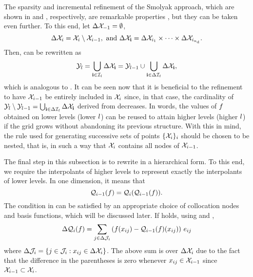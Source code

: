 The sparsity and incremental refinement of the Smolyak approach, which are shown
in  and , respectively, are
remarkable properties \perse, but they can be taken even further. To this end,
let $\Delta\mathcal{X}_{-1} = \emptyset$,
\[
  \Delta\mathcal{X}_i = \mathcal{X}_i \setminus \mathcal{X}_{i - 1}, \text{ and } \Delta\mathcal{X}_{\mathbf{i}} = \Delta\mathcal{X}_{i_1} \times \cdots \times \Delta\mathcal{X}_{i_{n_\text{d}}}.
\]
Then,  can be rewritten as
\begin{equation} \elab{smolyak-grid-incremental}
  \Y_\l = \bigcup_{\vi \in \lindex_\l} \Delta\X_\vi = \Y_{\l - 1} \cup \bigcup_{\vi \in \Delta\lindex_\l} \Delta\X_\vi,
\end{equation}
which is analogous to . It can be seen now that it is
beneficial to the refinement to have $\mathcal{X}_{i - 1}$ be entirely included in $\mathcal{X}_i$
since, in that case, the cardinality of $\mathcal{Y}_l \setminus \mathcal{Y}_{l - 1} =
\bigcup_{\mathbf{i} \in \Delta\mathcal{I}_l} \Delta\mathcal{X}_{\mathbf{i}}$ derived from
 decreases. In words, the values of $f$ obtained
on lower levels (lower $l$) can be reused to attain higher levels (higher $l$)
if the grid grows without abandoning its previous structure. With this in mind,
the rule used for generating successive sets of points $\{ \mathcal{X}_i \}_i$ should be
chosen to be nested, that is, in such a way that $\mathcal{X}_i$ contains all nodes of
$\mathcal{X}_{i - 1}$.

The final step in this subsection is to rewrite  in a
hierarchical form. To this end, we require the interpolants of higher levels to
represent exactly the interpolants of lower levels. In one dimension, it means
that
\begin{equation} \elab{tensor-exactness}
  \tensor{i - 1}(\f) = \tensor{i}(\tensor{i - 1}(\f)).
\end{equation}
The condition in  can be satisfied by an appropriate
choice of collocation nodes and basis functions, which will be discussed later.
If  holds, using  and
,
\[
  \Delta\mathcal{Q}_{i}(f) = \sum_{j \in \Delta\mathcal{J}_i} \left( f(x_{ij}) - \mathcal{Q}_{i - 1}(f)(x_{ij}) \right) \, e_{ij}
\]
where $\Delta\mathcal{J}_i = \{ j \in \mathcal{J}_i: x_{ij} \in \Delta\mathcal{X}_i \}$. The
above sum is over $\Delta\mathcal{X}_i$ due to the fact that the difference in the
parentheses is zero whenever $x_{ij} \in \mathcal{X}_{i - 1}$ since $\mathcal{X}_{i - 1} \subset
\mathcal{X}_i$.

